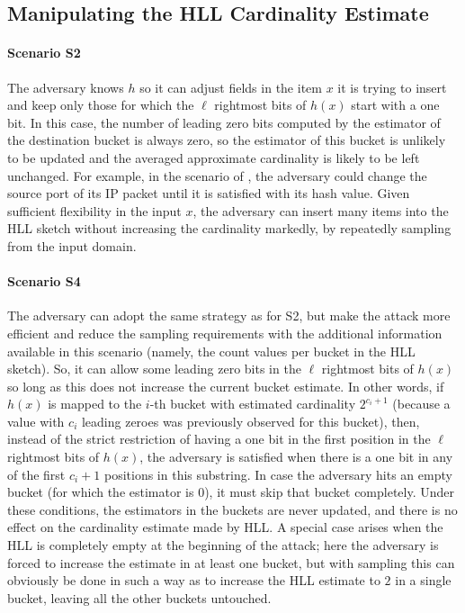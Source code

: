 \documentclass[11pt]{article}
\begin{document}
\subsection{Manipulating the HLL Cardinality Estimate}

\noindent\paragraph{Scenario S2} The adversary knows $h$ so it can adjust fields in the item $x$ it is trying to insert and keep only those for which the $\ell$ rightmost bits of $h(x)$ start with a one bit. In this case, the number of leading zero bits computed by the estimator of the destination bucket is always zero, so the estimator of this bucket is unlikely to be updated and the averaged approximate cardinality is likely to be left unchanged. For example, in the scenario of \cite{portscanhll}, the adversary could change the source port of its IP packet until it is satisfied with its hash value. Given sufficient flexibility in the input $x$, the adversary can insert many items into the HLL sketch without increasing the cardinality markedly, by repeatedly sampling from the input domain.

\noindent\paragraph{Scenario S4} The adversary can adopt the same strategy as for S2, but make the attack more efficient and reduce the sampling requirements with the additional information available in this scenario (namely, the count values per bucket in the HLL sketch). So, it can allow some leading zero bits in the $\ell$ rightmost bits of $h(x)$ so long as this does not increase the current bucket estimate. In other words, if $h(x)$ is mapped to the $i$-th bucket with estimated cardinality $2^{c_i + 1}$ (because a value with $c_i$ leading zeroes was previously observed for this bucket), then, instead of the strict restriction of having a one bit in the first position in the $\ell$ rightmost bits of $h(x)$, the adversary is satisfied when there is a one bit in any of the first $c_i+1$ positions in this substring. In case the adversary hits an empty bucket (for which the estimator is 0), it must skip that bucket completely. Under these conditions, the estimators in the buckets are never updated, and there is no effect on the cardinality estimate made by HLL.  A special case arises when the HLL is completely empty at the beginning of the attack; here the adversary is forced to increase the estimate in at least one bucket, but with sampling this can obviously be done in such a way as to increase the HLL estimate to $2$ in a single bucket, leaving all the other buckets untouched.
\end{document}
